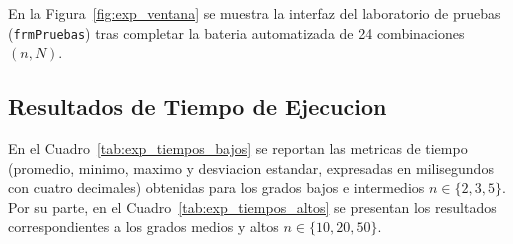 En la Figura~\ref{fig:exp_ventana} se muestra la interfaz del laboratorio de pruebas (\texttt{frmPruebas}) tras completar la bateria automatizada de 24 combinaciones $(n, N)$.


\subsection{Resultados de Tiempo de Ejecucion}
\label{subsec:exp_resultados_tiempos}

En el Cuadro~\ref{tab:exp_tiempos_bajos} se reportan las metricas de tiempo (promedio, minimo, maximo y desviacion estandar, expresadas en milisegundos con cuatro decimales) obtenidas para los grados bajos e intermedios $n \in \{2, 3, 5\}$. Por su parte, en el Cuadro~\ref{tab:exp_tiempos_altos} se presentan los resultados correspondientes a los grados medios y altos $n \in \{10, 20, 50\}$.

